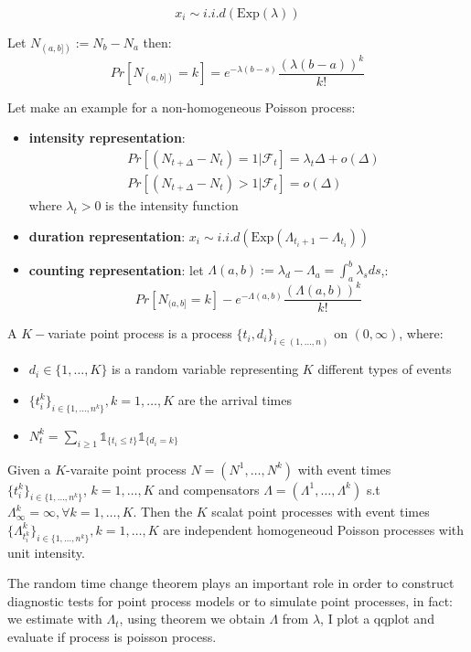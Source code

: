 \begin{mydefinition}
\[
x_i \sim i.i.d(\text{Exp}(\lambda))
\]
\end{mydefinition}
\begin{mydefinition}
Let $N_{(a,b])} := N_b - N_a$ then:
\[
Pr[N_{(a,b])} = k] = e^{-\lambda(b-s)}\frac{(\lambda (b-a))^k}{k!}
\]
\end{mydefinition}
Let make an example for a non-homogeneous Poisson process:
\begin{itemize}
    \item \textbf{intensity representation}:
    \begin{align*}
    	& Pr[(N_{t + \Delta} -N_t)=1|\mathcal{F}_t]=\lambda_t \Delta + o(\Delta)\\
    	& Pr[(N_{t + \Delta} -N_t)>1|\mathcal{F}_t]= o(\Delta)
    \end{align*}
    where $\lambda_t >0$ is the intensity function
    \item \textbf{duration representation}: $x_i \sim i.i.d(\text{Exp}(\Lambda_{t_i +1} - \Lambda_{t_i}))$
    \item \textbf{counting representation}: let $\Lambda(a,b):= \lambda_d - \Lambda_a = \int_a^b \lambda_sds$,:
    \[
    Pr[N_{(a,b]} = k] - e^{-\Lambda(a,b)} \frac{(\Lambda(a,b))^k}{k!}
    \] 
\end{itemize}
\begin{mydefinition}
A $K-$variate point process is a process $\{t_i,d_i\}_{i\in (1,\ldots,n)}$ on $(0,\infty)$, where:
\begin{itemize}
	\item $d_i \in \{1,\ldots,K\}$ is a random variable representing $K$ different types of events
	\item $\{t_i^k\}_{i\in \{1,\ldots,n^k\}}, k =1,\ldots,K$ are the arrival times
	\item $N_t^k = \sum_{i\geq 1} \mathds{1}_{\{t_i \leq t\}} \mathds{1}_{\{d_i = k\}}$
\end{itemize}
\end{mydefinition}
\newpage
\begin{mytheorem}
	Given a $K$-varaite point process $N  = (N^1,\ldots, N^k)$ with event times $\{t_i^k\}_{i\in \{1,\ldots,n^k\}}$, $k=1,\ldots,K$ and compensators $\Lambda = (\Lambda^1,\ldots, \Lambda^k)$ s.t $\Lambda^k_\infty = \infty, \forall k = 1,\ldots,K.$ Then the $K$ scalat point processes with event times $\{\Lambda^k_{t_i^k}\}_{i \in \{1,\ldots, n^k\}}, k=1,\ldots,K$ are independent homogeneoud Poisson processes with unit intensity.
\end{mytheorem}
The random time change theorem plays an important role in order to construct diagnostic tests for point process models or to simulate point processes, in fact: we estimate with $\Lambda_t$, using theorem we obtain $\Lambda$ from $\lambda$, I plot a qqplot and evaluate if process is poisson process.\\
